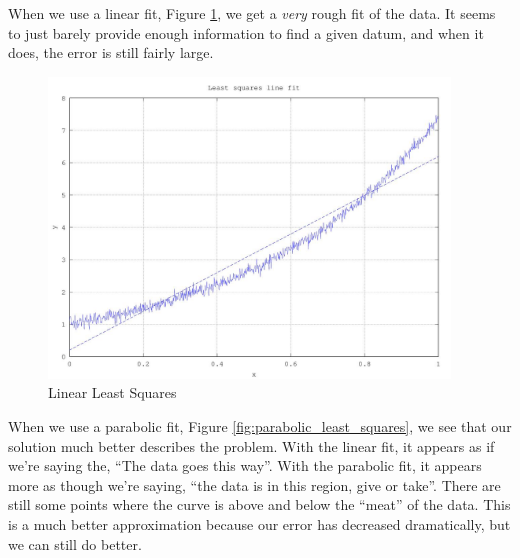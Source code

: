 \documentclass[12pt,letterpaper]{article}
\begin{document}
\begin{enumerate}
      When we use a linear fit, Figure \ref{fig:linear_least_squares}, we get a \textit{very} rough fit of the data. It seems to just barely provide enough information to find a given datum, and when it does, the error is still fairly large.

      \begin{figure}[h]
        \centering
        \includegraphics[width=0.95\textwidth]{least_squares_linear.jpg}
        \caption{Linear Least Squares}
        \label{fig:linear_least_squares}
      \end{figure}

      \pagebreak

      When we use a parabolic fit, Figure \ref{fig:parabolic_least_squares}, we see that our solution much better describes the problem.
      With the linear fit, it appears as if we're saying the, ``The data goes this way''.
      With the parabolic fit, it appears more as though we're saying, ``the data is in this region, give or take''. There are still some points where the curve is above and below the ``meat'' of the data. This is a much better approximation because our error has decreased dramatically, but we can still do better.


\end{enumerate}
\end{document}
